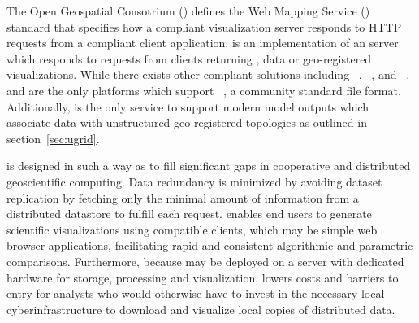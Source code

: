 The Open Geospatial Consotrium (\ogc{}) defines the Web Mapping
Service (\wms{})~\cite{wms14} standard that specifies how a compliant
visualization server responds to HTTP requests from a \ogcwms{}
compliant client application. \sciwms{} is an implementation of an
\ogcwms{} server which responds to requests from clients returning
\metadata{}, data or geo-registered visualizations.  While there
exists other \ogcwms{} compliant solutions including
\ncwms{}~\cite{blower13}, \mapserver{}~\cite{mapserver14}, and
\geoserver{}~\cite{geoserver14}, \sciwms{} and \ncwms{} are the only
platforms which support \netcdf{}~\cite{netcdf}, a community standard
file format. Additionally, \sciwms{} is the only \ogcwms{} service to
support modern model outputs which associate data with unstructured
geo-registered topologies as outlined in section~\ref{sec:ugrid}.

\sciwms{} is designed in such a way as to fill significant gaps in
cooperative and distributed geoscientific computing. Data redundancy
is minimized by avoiding dataset replication by fetching only the
minimal amount of information from a distributed datastore to fulfill each
\ogcwms{} request. \sciwms{} enables end users to generate scientific
visualizations using \ogcwms{} compatible clients, which may be simple
web browser applications, facilitating rapid and consistent
algorithmic and parametric comparisons. Furthermore, because \sciwms{}
may be deployed on a server with dedicated hardware for storage,
processing and visualization, \sciwms{} lowers costs and barriers to
entry for analysts who would otherwise have to invest in the necessary
local cyberinfrastructure to download and visualize local copies of
distributed data.
